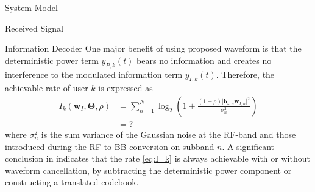 \documentclass{IEEEtran}
\begin{document}
\begin{section} {System Model}
\begin{subsection}	{Received Signal}
	\end{subsection}

	\begin{subsection}	{Information Decoder}
		One major benefit of using proposed waveform is that the deterministic power term $y_{P,k}(t)$ bears no information and creates no interference to the modulated information term $y_{I,k}(t)$. Therefore, the achievable rate of user $k$ is expressed as
		\begin{equation}	\label{eq:I_k}
			\begin{split}
				I_k(\boldsymbol{w}_I,\boldsymbol{\Theta},\rho)
				&=\sum_{n=1}^N{\log_2\left(1+\frac{(1-\rho)\lvert\boldsymbol{h}_{k,n}\boldsymbol{w}_{I,n}\rvert^2}{\sigma_n^2}\right)}	\\
				&=?
			\end{split}
		\end{equation}
		where $\sigma_n^2$ is the sum variance of the Gaussian noise at the RF-band and those introduced during the RF-to-BB conversion on subband $n$. A significant conclusion in \cite{Clerckx2018b} indicates that the rate \ref{eq:I_k} is always achievable with or without waveform cancellation, by subtracting the deterministic power component or constructing a translated codebook.
	\end{subsection}


\end{section}
\end{document}
